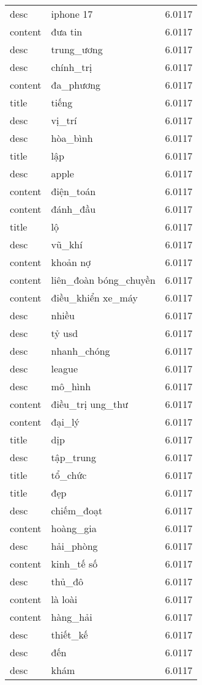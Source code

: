 \documentclass{article}
\begin{document}
\begin{tabular}{lll}
desc & iphone 17 & 6.0117\\
content & đưa tin & 6.0117\\
desc & trung\_ương & 6.0117\\
desc & chính\_trị & 6.0117\\
content & đa\_phương & 6.0117\\
title & tiếng & 6.0117\\
desc & vị\_trí & 6.0117\\
desc & hòa\_bình & 6.0117\\
title & lập & 6.0117\\
desc & apple & 6.0117\\
content & điện\_toán & 6.0117\\
content & đánh\_đầu & 6.0117\\
title & lộ & 6.0117\\
desc & vũ\_khí & 6.0117\\
content & khoản nợ & 6.0117\\
content & liên\_đoàn bóng\_chuyền & 6.0117\\
content & điều\_khiển xe\_máy & 6.0117\\
desc & nhiều & 6.0117\\
desc & tỷ usd & 6.0117\\
desc & nhanh\_chóng & 6.0117\\
desc & league & 6.0117\\
desc & mô\_hình & 6.0117\\
content & điều\_trị ung\_thư & 6.0117\\
content & đại\_lý & 6.0117\\
title & dịp & 6.0117\\
desc & tập\_trung & 6.0117\\
title & tổ\_chức & 6.0117\\
title & đẹp & 6.0117\\
desc & chiếm\_đoạt & 6.0117\\
content & hoàng\_gia & 6.0117\\
desc & hải\_phòng & 6.0117\\
content & kinh\_tế số & 6.0117\\
desc & thủ\_đô & 6.0117\\
content & là loài & 6.0117\\
content & hàng\_hải & 6.0117\\
desc & thiết\_kế & 6.0117\\
desc & đến & 6.0117\\
desc & khám & 6.0117\\

\end{tabular}
\end{document}
